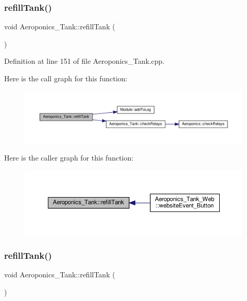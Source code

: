 \subsubsection{\texorpdfstring{refill\+Tank()}{refillTank()}\hspace{0.1cm}{\footnotesize\ttfamily [1/2]}}
{\footnotesize\ttfamily void Aeroponics\+\_\+\+Tank\+::refill\+Tank (\begin{DoxyParamCaption}{ }\end{DoxyParamCaption})\hspace{0.3cm}{\ttfamily [protected]}}



Definition at line 151 of file Aeroponics\+\_\+\+Tank.\+cpp.

Here is the call graph for this function\+:
\nopagebreak
\begin{figure}[H]
\begin{center}
\leavevmode
\includegraphics[width=350pt]{class_aeroponics___tank_a95906ab4c83355062f26e898edbc2337_cgraph}
\end{center}
\end{figure}
Here is the caller graph for this function\+:
\nopagebreak
\begin{figure}[H]
\begin{center}
\leavevmode
\includegraphics[width=350pt]{class_aeroponics___tank_a95906ab4c83355062f26e898edbc2337_icgraph}
\end{center}
\end{figure}
\mbox{\label{class_aeroponics___tank_a95906ab4c83355062f26e898edbc2337}} 
\subsubsection{\texorpdfstring{refill\+Tank()}{refillTank()}\hspace{0.1cm}{\footnotesize\ttfamily [2/2]}}
{\footnotesize\ttfamily void Aeroponics\+\_\+\+Tank\+::refill\+Tank (\begin{DoxyParamCaption}{ }\end{DoxyParamCaption})\hspace{0.3cm}{\ttfamily [protected]}}

